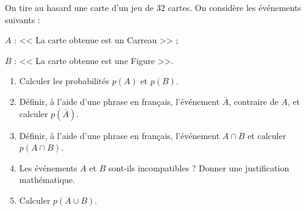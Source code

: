 \documentclass[10pt,french]{book}
\begin{document}
\exo On tire au hasard une carte d'un jeu de $32$ cartes. On considère les événements suivants :\par
    $A$ : << La carte obtenue est un Carreau >> ;\par
    $B$ : << La carte obtenue est une Figure >>.
    
    \begin{enumerate}
        \item Calculer les probabilités $p(A)$ et $p(B)$.
        \item Définir, à l'aide d'une phrase en français, l'événement $\overline A$, contraire de $A$, et calculer $p\left(\overline A\right)$.
        \item Définir, à l'aide d'une phrase en français, l'événement $A \cap B$ et calculer $p\left(A \cap B\right)$.
        \item Les événements $A$ et $B$ sont-ils incompatibles ? Donner une justification mathématique.
        \item Calculer $p(A\cup B)$.
    \end{enumerate}
\end{document}
